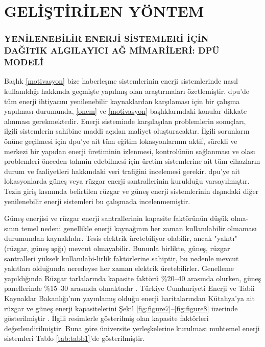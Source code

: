 \part{GELİŞTİRİLEN YÖNTEM}
\thispagestyle{empty}
\newpage
\section{YENİLENEBİLİR ENERJİ SİSTEMLERİ İÇİN\\DAĞITIK ALGILAYICI AĞ MİMARİLERİ: DPÜ MODELİ}

 Başlık \ref{motivasyon} bize haberleşme sistemlerinin enerji sistemlerinde nasıl kullanıldığı hakkında geçmişte yapılmış olan araştırmaları özetlemiştir. \gls{dpu}'de tüm enerji ihtiyacını yenilenebilir kaynaklardan karşılaması için bir çalışma yapılması durumunda, \ref{onem} ve \ref{motivasyon} başlıklarındaki konular dikkate alınması gerekmektedir. Enerji sisteminde karşılaşılan problemlerin sonuçları, ilgili sistemlerin sahibine maddi açıdan maliyet oluşturacaktır. İlgili sorunların önüne geçilmesi için \gls{dpu}’ye ait tüm eğitim lokasyonlarının aktif, sürekli ve merkezi bir yapıdan enerji üretiminin izlenmesi, kontrolünün sağlanması ve olası problemleri önceden tahmin edebilmesi için üretim sistemlerine ait tüm cihazların durum ve faaliyetleri hakkındaki veri trafiğini incelemesi gerekir. \gls{dpu}’ye ait lokasyonlarda güneş veya rüzgar enerji santrallerinin kurulduğu varsayılmıştır. Tezin giriş kısmında belirtilen rüzgar ve güneş enerji sistemlerinin dışındaki diğer yenilenebilir enerji sistemleri bu çalışmada incelenmemiştir.

Güneş enerjisi ve rüzgar enerji santrallerinin kapasite faktörünün düşük olma-sının temel nedeni genellikle enerji kaynağının her zaman kullanılabilir olmaması durumundan kaynaklıdır. Tesis elektrik üretebiliyor olabilir, ancak "yakıtı" (rüzgar, güneş ışığı) mevcut olmayabilir. Bununla birlikte, güneş, rüzgar santralleri yüksek kullanılabi-lirlik faktörlerine sahiptir, bu nedenle mevcut yakıtları olduğunda neredeyse her zaman elektrik üretebilirler. Genelleme yapıldığında Rüzgar tarlalarında kapasite faktörü \%20--40 arasında olurken, güneş panellerinde \%15--30 arasında olmaktadır \cite{hussain2014multilayer}. Türkiye Cumhuriyeti Enerji ve Tabii Kaynaklar Bakanlığı’nın yayınlamış olduğu enerji haritalarından Kütahya’ya ait rüzgar ve güneş enerji kapasitelerini Şekil \ref{fig:figure7}--\ref{fig:figure8} üzerinde gösterilmiştir \cite{repa}\cite{gepa}. İlgili resimlerle gösterilmiş olan kapasite faktörleri değerlendirilmiştir. Buna göre üniversite yerleşkelerine kurulması muhtemel enerji sistemleri Tablo \ref{tab:tabb1}'de gösterilmiştir.

